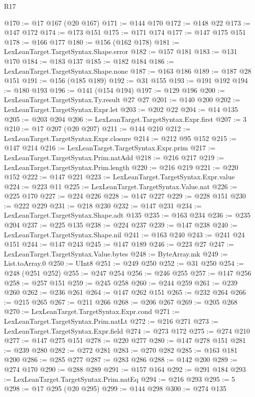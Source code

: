 \begin{lexlean}{R17}
\begin{coremodule}
@170 := @17 @167 (@20 @167)
@171 := @144 @170
@172 := @148 @22
@173 := @147 @172
@174 := @173 @151
@175 := @171 @174
@177 := @147 @175 @151
@178 := @166 @177
@180 := @156 (@162 @178)
@181 := LexLeanTarget.TargetSyntax.Shape.error
@182 := @157 @181
@183 := @131 @170
@184 := @183 @137
@185 := @182 @184
@186 := LexLeanTarget.TargetSyntax.Shape.none
@187 := @163 @186
@189 := @187 @28 @151
@191 := @156 (@185 @189)
@192 := @31 @155
@193 := @191 @192
@194 := @180 @193
@196 := @141 (@154 @194)
@197 := @129 @196
@200 := LexLeanTarget.TargetSyntax.Ty.result @27 @27
@201 := @140 @200
@202 := LexLeanTarget.TargetSyntax.Expr.let
@203 := @202 @22
@204 := @14 @135
@205 := @203 @204
@206 := LexLeanTarget.TargetSyntax.Expr.first
@207 := 3
@210 := @17 @207 (@20 @207)
@211 := @144 @210
@212 := LexLeanTarget.TargetSyntax.Expr.closure
@214 := @212 @95 @152
@215 := @147 @214
@216 := LexLeanTarget.TargetSyntax.Expr.prim
@217 := LexLeanTarget.TargetSyntax.Prim.natAdd
@218 := @216 @217
@219 := LexLeanTarget.TargetSyntax.Prim.length
@220 := @216 @219
@221 := @220 @152
@222 := @147 @221
@223 := LexLeanTarget.TargetSyntax.Expr.value
@224 := @223 @11
@225 := LexLeanTarget.TargetSyntax.Value.nat
@226 := @225 @170
@227 := @224 @226
@228 := @147 @227
@229 := @228 @151
@230 := @222 @229
@231 := @218 @230
@232 := @147 @231
@234 := LexLeanTarget.TargetSyntax.Shape.adt @135
@235 := @163 @234
@236 := @235 @204
@237 := @225 @135
@238 := @224 @237
@239 := @147 @238
@240 := LexLeanTarget.TargetSyntax.Shape.nil
@241 := @163 @240
@243 := @241 @24 @151
@244 := @147 @243
@245 := @147 @189
@246 := @223 @27
@247 := LexLeanTarget.TargetSyntax.Value.bytes
@248 := ByteArray.mk
@249 := List.toArray.{0}
@250 := UInt8
@251 := @249 @250
@252 := @31 @250
@254 := @248 (@251 @252)
@255 := @247 @254
@256 := @246 @255
@257 := @147 @256
@258 := @257 @151
@259 := @245 @258
@260 := @244 @259
@261 := @239 @260
@262 := @236 @261
@264 := @147 @262 @151
@265 := @232 @264
@266 := @215 @265
@267 := @211 @266
@268 := @206 @267
@269 := @205 @268
@270 := LexLeanTarget.TargetSyntax.Expr.cond
@271 := LexLeanTarget.TargetSyntax.Prim.natLt
@272 := @216 @271
@273 := LexLeanTarget.TargetSyntax.Expr.field
@274 := @273 @172
@275 := @274 @210
@277 := @147 @275 @151
@278 := @220 @277
@280 := @147 @278 @151
@281 := @239 @280
@282 := @272 @281
@283 := @270 @282
@285 := @163 @181 @200
@286 := @285 @277
@287 := @283 @286
@288 := @142 @200
@289 := @274 @170
@290 := @288 @289
@291 := @157 @164
@292 := @291 @184
@293 := LexLeanTarget.TargetSyntax.Prim.natEq
@294 := @216 @293
@295 := 5
@298 := @17 @295 (@20 @295)
@299 := @144 @298
@300 := @274 @135

\end{coremodule}
\end{lexlean}
